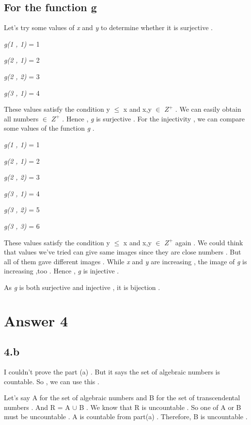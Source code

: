 \documentclass[12pt]{article}
\begin{document}
\subsection*{For the function g}
\hspace{15px} Let's try some values of \textit{x} and \textit{y} to determine whether it is surjective . \par 
\textit{g(1 , 1)} = 1 \par 
\textit{g(2 , 1)} = 2 \par 
\textit{g(2 , 2)} = 3 \par 
\textit{g(3 , 1)} = 4 \par 
These values satisfy the condition y $\leq$ x and x,y $\in$ \textit{$Z^{+}$} . We can easily obtain all numbers $\in$ \textit{$Z^{+}$} . Hence , \textit{g} is surjective . For the injectivity , we can compare some values of the function \textit{g} .\par 
\textit{g(1 , 1)} = 1 \par 
\textit{g(2 , 1)} = 2 \par 
\textit{g(2 , 2)} = 3 \par 
\textit{g(3 , 1)} = 4 \par 
\textit{g(3 , 2)} = 5 \par 
\textit{g(3 , 3)} = 6 \par 
These values satisfy the condition y $\leq$ x and x,y $\in$ \textit{$Z^{+}$} again . We could think that values we've tried can give same images since they are close numbers . But all of them gave different images . While \textit{x} and \textit{y} are increasing , the image of \textit{g} is increasing ,too . Hence , \textit{g} is injective . \par 
As \textit{g} is both surjective and injective , it is bijection .

\section*{Answer 4}

\subsection*{4.b}
\hspace{15px} I couldn't prove the part (a) . But it says the set of algebraic numbers is countable. So , we can use this . \par 
Let's say A for the set of algebraic numbers and B for the set of transcendental numbers . And R = A $\cup$ B . We know that R is uncountable . So one of A or B must be uncountable . A is countable from part(a) . Therefore, B is uncountable .
\end{document}
